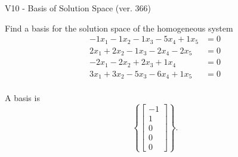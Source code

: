 \begin{exercise}
  \begin{exerciseTitle}V10 - Basis of Solution Space (ver. 366)\end{exerciseTitle}
  \begin{exerciseStatement}
    Find a basis for the solution space of the homogeneous system 
\begin{align*}
 -1 x_ 1 -1 x_ 2 -1 x_ 3 -5 x_ 4 + 1 x_ 5 &= 0  \\ 
  2 x_ 1 + 2 x_ 2 -1 x_ 3 -2 x_ 4 -2 x_ 5 &= 0  \\ 
  -2 x_ 1 -2 x_ 2 + 2 x_ 3 + 1 x_ 4 &= 0  \\ 
  3 x_ 1 + 3 x_ 2 -5 x_ 3 -6 x_ 4 + 1 x_ 5 &= 0  \\ 
 \end{align*}


 
  \end{exerciseStatement}

  \begin{exerciseAnswer}
   A basis is   
\[\left\{\left[\begin{array}{c}
-1 \\
1 \\
0 \\
0 \\
0
\end{array}\right]\right\}.\]

  


  \end{exerciseAnswer}
\end{exercise}
